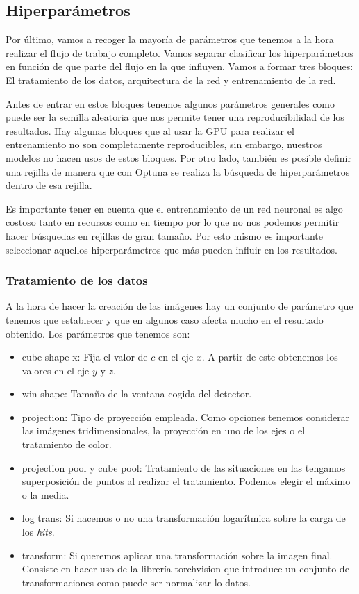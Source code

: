 \documentclass[a4paper,12pt,twoside,titlepage]{article}
\begin{document}
\subsection{Hiperparámetros}

Por último, vamos a recoger la mayoría de parámetros que tenemos a la hora realizar el flujo de trabajo completo. Vamos separar clasificar los hiperparámetros en función de que parte del flujo en la que influyen. Vamos a formar tres bloques: El tratamiento de los datos, arquitectura de la red y entrenamiento de la red.

Antes de entrar en estos bloques tenemos algunos parámetros generales como puede ser la semilla aleatoria que nos permite tener una reproducibilidad de los resultados. Hay algunas bloques que al usar la GPU para realizar el entrenamiento no son completamente reproducibles, sin embargo, nuestros modelos no hacen usos de estos bloques. Por otro lado, también es posible definir una rejilla de manera que con Optuna se realiza la búsqueda de hiperparámetros dentro de esa rejilla.

Es importante tener en cuenta que el entrenamiento de un red neuronal es algo costoso tanto en recursos como en tiempo por lo que no nos podemos permitir hacer búsquedas en rejillas de gran tamaño. Por esto mismo es importante seleccionar aquellos hiperparámetros que más pueden influir en los resultados.

\subsubsection*{Tratamiento de los datos}

A la hora de hacer la creación de las imágenes hay un conjunto de parámetro que tenemos que establecer y que en algunos caso afecta mucho en el resultado obtenido. Los parámetros que tenemos son:

\begin{itemize}
  \item cube shape x: Fija el valor de $c$ en el eje $x$. A partir de este obtenemos los valores en el eje $y$ y $z$. 
  \item win shape: Tamaño de la ventana cogida del detector.
  \item projection: Tipo de proyección empleada. Como opciones tenemos considerar las imágenes tridimensionales, la proyección en uno de los ejes o el tratamiento de color.
  \item projection pool y cube pool: Tratamiento de las situaciones en las tengamos superposición de puntos al realizar el tratamiento. Podemos elegir el máximo o la media.
  \item log trans: Si hacemos o no una transformación logarítmica sobre la carga de los \textit{hits}.
  \item transform: Si queremos aplicar una transformación sobre la imagen final. Consiste en hacer uso de la librería torchvision que introduce un conjunto de transformaciones como puede ser normalizar lo datos.
\end{itemize}
\end{document}

